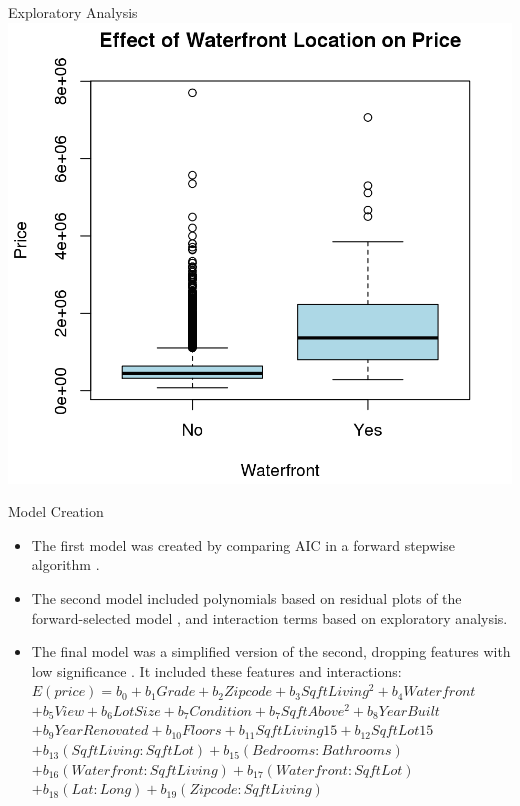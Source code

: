 \documentclass[final]{beamer}
\begin{document}
\begin{frame}[fragile]
\begin{columns}[t]
\begin{column}{0.31\linewidth}
\begin{minipage}[t][.955\textheight]{\linewidth}
\begin{block}{Exploratory Analysis}
\centering
\includegraphics{waterfront.png}
\vspace{0ex}
\end{block}
\vfill

\begin{block}{Model Creation}
\begin{itemize}
\item The first model was created by comparing AIC in a forward stepwise algorithm \cite{R-MASS}.
\item The second model included polynomials based on residual plots of the forward-selected model \cite{R-car}, and interaction terms based on exploratory analysis.
\item The final model was a simplified version of the second, dropping features with low significance \cite{james_introduction_2013}. It included these features and interactions: $E(price) = b_0 + b_1 Grade + b_2 Zipcode + b_3 SqftLiving^2 + b_4 Waterfront$
$+ b_5 View + b_6 LotSize + b_7 Condition + b_7 SqftAbove^2 + b_8 YearBuilt$
$+ b_9 YearRenovated + b_{10} Floors + b_{11} SqftLiving15 + b_{12} SqftLot15$
$+ b_{13} (SqftLiving:SqftLot) + b_{15} (Bedrooms:Bathrooms)$
$+ b_{16} (Waterfront:SqftLiving) + b_{17} (Waterfront:SqftLot)$
$+ b_{18} (Lat:Long) + b_{19} (Zipcode:SqftLiving)$
\end{itemize}
\vspace{0ex}
\end{block}
\vfill


\end{minipage}
\end{column}
\end{columns}
\end{frame}
\end{document}
